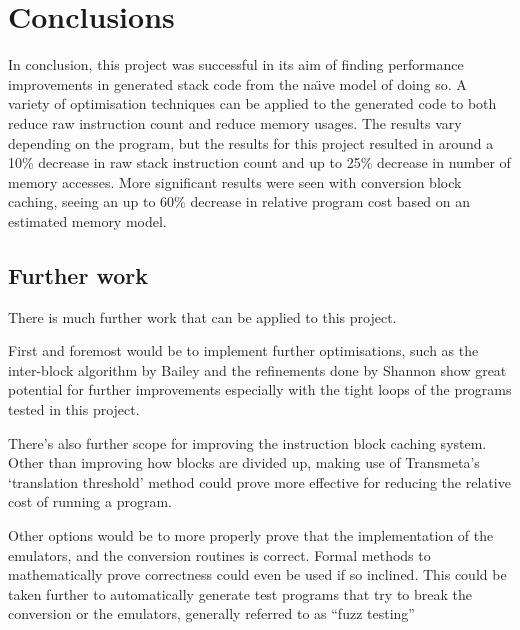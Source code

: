 \chapter{Conclusions}\label{ch:conclusions}
In conclusion, this project was successful in its aim of finding performance
improvements in generated stack code from the na{\"\i}ve model of doing so. A
variety of optimisation techniques can be applied to the generated code to
both reduce raw instruction count and reduce memory usages. The results vary
depending on the program, but the results for this project resulted in around a
10\% decrease in raw stack instruction count and up to 25\% decrease in number
of memory accesses. More significant results were seen with conversion block
caching, seeing an up to 60\% decrease in relative program cost based on an
estimated memory model.

\section{Further work}\label{sec:furtherwork}
There is much further work that can be applied to this project.

First and foremost would be to implement further optimisations, such as the
inter-block algorithm by Bailey and the refinements done by Shannon show great
potential for further improvements especially with the tight loops of the
programs tested in this project.

There's also further scope for improving the instruction block caching system.
Other than improving how blocks are divided up, making use of Transmeta's
`translation threshold' method could prove more effective for reducing the
relative cost of running a program.

Other options would be to more properly prove that the implementation of the
emulators, and the conversion routines is correct. Formal methods to
mathematically prove correctness could even be used if so inclined. This could
be taken further to automatically generate test programs that try to break the
conversion or the emulators, generally referred to as ``fuzz testing''

